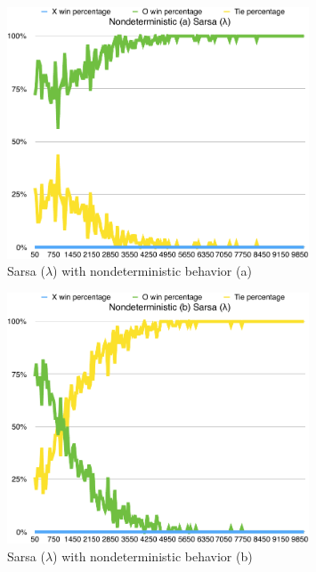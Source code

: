 \documentclass{journal}
\begin{document}
\begin{figure}[h]
	\includegraphics[width=0.8\textwidth]{SarsaLN(a).pdf}
	\caption{Sarsa ($\lambda{}$) with nondeterministic behavior (a)}\label{fig:SLNA}
\end{figure}
\begin{figure}[h]
	\includegraphics[width=0.8\textwidth]{SarsaLN(b).pdf}
	\caption{Sarsa ($\lambda{}$) with nondeterministic behavior (b)}\label{fig:SLNB}
\end{figure}


\clearpage{}
\end{document}
